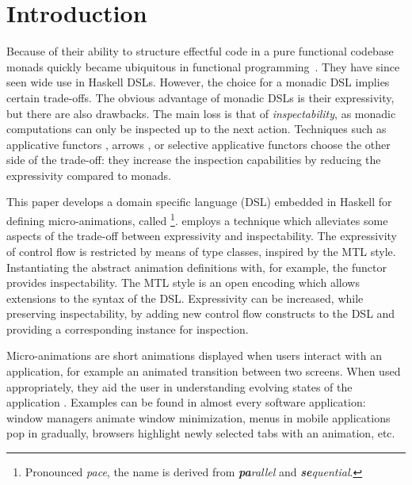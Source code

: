 \section{Introduction}
\label{sec:intro}


Because of their ability to structure effectful code in a pure functional codebase monads quickly became ubiquitous in functional programming~\cite{DBLP:conf/lfp/Wadler90}. They have since seen wide use in Haskell DSLs. However, the choice for a monadic DSL implies certain trade-offs.  The obvious advantage of monadic DSLs is their expressivity, but there are also drawbacks. The main loss is that of \emph{inspectability}, as monadic computations can only be inspected up to the next action.  Techniques such as applicative functors \cite{DBLP:journals/jfp/McbrideP08}, arrows \cite{DBLP:journals/scp/Hughes00}, or selective applicative functors \cite{Mokhov:2019:SAF:3352468.3341694} choose the other side of the trade-off: they increase the inspection capabilities by reducing the expressivity compared to monads.

This paper develops a domain specific language (DSL) embedded in Haskell for defining micro-animations, called \dsl{}\footnote{Pronounced \textit{pace}, the name is derived from \textit{\textbf{pa}rallel} and \textit{\textbf{se}quential}.}. \dsl{} employs a technique which alleviates some aspects of the trade-off between expressivity and inspectability. The expressivity of control flow is restricted by means of type classes, inspired by the MTL style. Instantiating the abstract animation definitions with, for example, the  functor provides inspectability. The MTL style is an open encoding which allows extensions to the syntax of the DSL. Expressivity can be increased, while preserving inspectability, by adding new control flow constructs to the DSL and providing a corresponding instance for inspection.

Micro-animations are short animations displayed when users interact with an application, for example an animated transition between two screens. When used appropriately, they aid the user in understanding evolving states of the application \cite{DBLP:conf/infovis/BedersonB99,DBLP:conf/chi/Gonzalez96,DBLP:journals/tvcg/HeerR07}.  Examples can be found in almost every software application: window managers animate window minimization, menus in mobile applications pop in gradually, browsers highlight newly selected tabs with an animation, etc.

